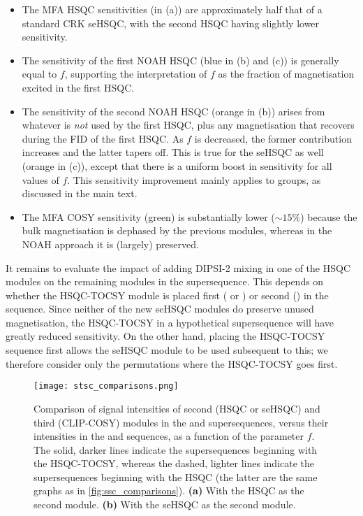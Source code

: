 \begin{itemize}
    \item The MFA HSQC sensitivities (in (a)) are approximately half that of a standard CRK seHSQC, with the second HSQC having slightly lower sensitivity.\autocite{Nolis2019CPC}
    \item The sensitivity of the first NOAH HSQC (blue in (b) and (c)) is generally equal to $f$, supporting the interpretation of $f$ as the fraction of  magnetisation excited in the first HSQC.
    \item The sensitivity of the second NOAH HSQC (orange in (b)) arises from whatever is \textit{not} used by the first HSQC, plus any magnetisation that recovers during the FID of the first HSQC.
        As $f$ is decreased, the former contribution increases and the latter tapers off.
        This is true for the seHSQC as well (orange in (c)), except that there is a uniform boost in sensitivity for all values of $f$.
        This sensitivity improvement mainly applies to  groups, as discussed in the main text.
    \item The MFA COSY sensitivity (green) is substantially lower ($\sim 15\%$) because the bulk magnetisation is dephased by the previous modules, whereas in the NOAH approach it is (largely) preserved.
\end{itemize}

It remains to evaluate the impact of adding DIPSI-2 mixing in one of the HSQC modules on the remaining modules in the supersequence.
This depends on whether the HSQC-TOCSY module is placed first ( or ) or second () in the sequence.
Since neither of the new seHSQC modules do preserve unused  magnetisation, the HSQC-TOCSY in a hypothetical  supersequence will have greatly reduced sensitivity.
On the other hand, placing the HSQC-TOCSY sequence first allows the seHSQC module to be used subsequent to this; we therefore consider only the permutations where the HSQC-TOCSY goes first.

\begin{figure}
    \centering
    \texttt{[image: stsc\_comparisons.png]}
    \caption{
        Comparison of signal intensities of second (HSQC or seHSQC) and third (CLIP-COSY) modules in the  and  supersequences, versus their intensities in the  and  sequences, as a function of the parameter $f$.
        The solid, darker lines indicate the supersequences beginning with the HSQC-TOCSY, whereas the dashed, lighter lines indicate the supersequences beginning with the HSQC (the latter are the same graphs as in \cref{fig:ssc_comparisons}).
        \textbf{(a)} With the HSQC as the second module.
        \textbf{(b)} With the seHSQC as the second module.
        \andro{}
    }
    \label{fig:stsc_comparisons}
\end{figure}

